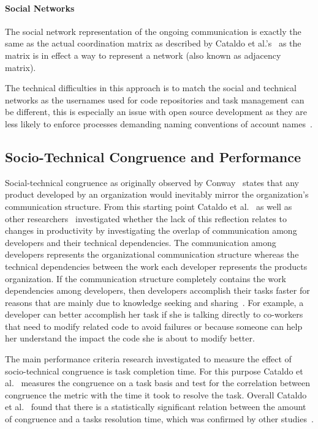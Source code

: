 \paragraph{Social Networks}
The social network representation of the ongoing communication is exactly the same as the actual coordination matrix as described by Cataldo et al.'s~\cite{cataldo:cscw:2006} as the matrix is in effect a way to represent a network (also known as adjacency matrix).

The technical difficulties in this approach is to match the social and technical networks as the usernames used for code repositories and task management can be different, this is especially an issue with open source development as they are less likely to enforce processes demanding naming conventions of account names~\cite{schroeter:isese:2006}.

\subsection{Socio-Technical Congruence and Performance}
Social-technical congruence as originally observed by Conway~\cite{conway:datamination:1968} states that any product developed by an organization would inevitably mirror the organization's communication structure.
From this starting point Cataldo et al.~\cite{cataldo:cscw:2006} as well as other researchers~\cite{valetto:msr:2007,ducheneaut:cscw:2005,ehrlich:stc:2008} investigated whether the lack of this reflection relates to changes in productivity by investigating the overlap of communication among developers and their technical dependencies.
The communication among developers represents the organizational communication structure whereas the technical dependencies between the work each developer represents the products organization.
If the communication structure completely contains the work dependencies among developers, then developers accomplish their tasks faster for reasons that are mainly due to knowledge seeking and sharing~\cite{desouza2006:knowledge}.
For example, a developer can better accomplish her task if she is talking directly to co-workers that need to modify related code to avoid failures or because someone can help her understand the impact the code she is about to modify better.

The main performance criteria research investigated to measure the effect of socio-technical congruence is task completion time.
For this purpose Cataldo et al.~\cite{cataldo:cscw:2006} measures the congruence on a task basis and test for the correlation between congruence the metric with the time it took to resolve the task.
Overall Cataldo et al.~\cite{cataldo:cscw:2006} found that there is a statistically significant relation between the amount of congruence and a tasks resolution time, which was confirmed by other studies~\cite{valetto:msr:2007,ehrlich:stc:2008}.


